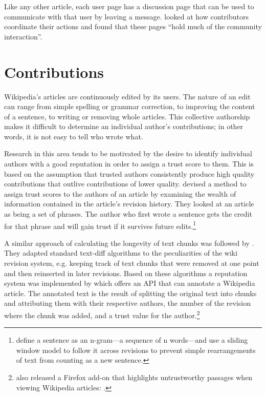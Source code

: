 Like any other article, each user page has a discussion page that can be used to communicate with that user by leaving a message.
\textcite{Viegas2007talk} looked at how contributors coordinate their actions and found that these pages ``hold much of the community interaction''.


\section{Contributions}\label{sec:contribution}

Wikipedia's articles are continuously edited by its users.
The nature of an edit can range from simple spelling or grammar correction, to improving the content of a sentence, to writing or removing whole articles. 
This collective authorship makes it difficult to determine an individual author's contributions; in other words, it is not easy to tell who wrote what.

Research in this area tends to be motivated by the desire to identify individual authors with a good reputation in order to assign a trust score to them.
This is based on the assumption that trusted authors consistently produce high quality contributions that outlive contributions of lower quality.
\textcite{kramer2008wiki} devised a method to assign trust scores to the authors of an article by examining the wealth of information contained in the article's revision history.
They looked at an article as being a set of phrases.
The author who first wrote a sentence gets the credit for that phrase and will gain trust if it survives future edits.\footnote{\textcite{kramer2008wiki} define a sentence as an n-gram---a sequence of n words---and use a sliding window model to follow it across revisions to prevent simple rearrangements of text from counting as a new sentence.}

A similar approach of calculating the longevity of text chunks was followed by \textcite{adler2007content}.
They adapted standard text-diff algorithms to the peculiarities of the wiki revision system, e.g. keeping track of text chunks that were removed at one point and then reinserted in later revisions.
Based on these algorithms a reputation system was implemented by \textcite{adler2008assigning} which offers an \ac{API} that can annotate a Wikipedia article.
The annotated text is the result of splitting the original text into chunks and attributing them with their respective authors, the number of the revision where the chunk was added, and a trust value for the author.\footnote{\citeauthor{adler2008assigning} also released a Firefox add-on that highlights untrustworthy passages when viewing Wikipedia articles: .}


